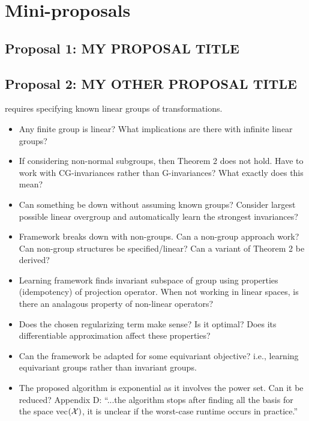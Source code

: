 

\section{Mini-proposals}

\subsection{Proposal 1: MY PROPOSAL TITLE} %


\subsection{Proposal 2: MY OTHER PROPOSAL TITLE} %



\parencite{Mouli:2021} requires specifying known linear groups of transformations.
\begin{itemize}

\item
Any finite group is linear? What implications are there with infinite linear groups?

\item
If considering non-normal subgroups, then Theorem 2 does not hold. Have to work with CG-invariances rather than G-invariances? What exactly does this mean?

\item
Can something be down without assuming known groups? Consider largest possible linear overgroup and automatically learn the strongest invariances?

\item
Framework breaks down with non-groups. Can a non-group approach work? Can non-group structures be specified/linear? Can a variant of Theorem 2 be derived?

\item
Learning framework finds invariant subspace of group using properties (idempotency) of projection operator. When not working in linear spaces, is there an analagous property of non-linear operators?

\item
Does the chosen regularizing term make sense? Is it optimal? Does its differentiable approximation affect these properties?

\item
Can the framework be adapted for some equivariant objective? i.e., learning equivariant groups rather than invariant groups.

\item
The proposed algorithm is exponential as it involves the power set. Can it be reduced? Appendix D: ``...the algorithm stops after finding all the basis for the space vec$(\mathcal{X})$, it is unclear if the worst-case runtime occurs in practice.''

\end{itemize}